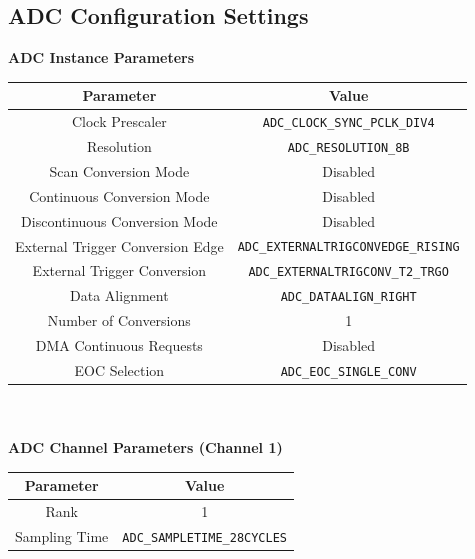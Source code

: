 \documentclass[12pt]{report}
\begin{document}
\begin{appendix}
	\chapter{ADC Configuration Settings}\label{appendixadc}
	\textbf{ADC Instance Parameters}\\
	\begin{tabular}{|c|c|}
		\hline
		Parameter & Value\\\hline
		Clock Prescaler & \texttt{ADC\_CLOCK\_SYNC\_PCLK\_DIV4}\\\hline
		Resolution & \texttt{ADC\_RESOLUTION\_8B}\\\hline
		Scan Conversion Mode & Disabled\\\hline
		Continuous Conversion Mode & Disabled\\\hline
		Discontinuous Conversion Mode & Disabled\\\hline
		External Trigger Conversion Edge & \texttt{ADC\_EXTERNALTRIGCONVEDGE\_RISING}\\\hline
		External Trigger Conversion & \texttt{ADC\_EXTERNALTRIGCONV\_T2\_TRGO}\\\hline
		Data Alignment & \texttt{ADC\_DATAALIGN\_RIGHT}\\\hline
		Number of Conversions & 1\\\hline
		DMA Continuous Requests & Disabled\\\hline
		EOC Selection & \texttt{ADC\_EOC\_SINGLE\_CONV}\\\hline
	\end{tabular}
	\newline
	\\\\
	\textbf{ADC Channel Parameters (Channel 1)}\\
	\begin{tabular}{|c|c|}
		\hline
		Parameter & Value\\\hline
		Rank & 1\\\hline
		Sampling Time & \texttt{ADC\_SAMPLETIME\_28CYCLES}\\\hline
	\end{tabular}
	\newpage
	

\end{appendix}
\end{document}
